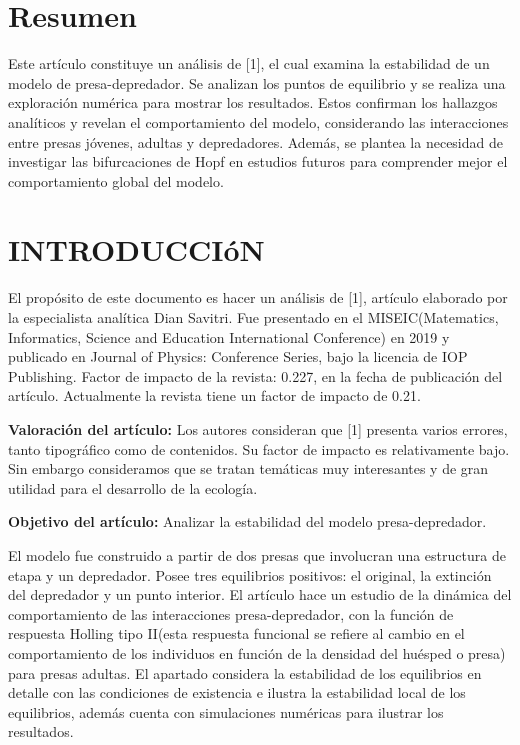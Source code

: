 \documentclass{wscpaperproc}
\theoremstyle{wsc}
\begin{document}
\maketitle

\section*{Resumen}
Este artículo constituye un análisis de [1], el cual examina la estabilidad de un modelo de presa-depredador.
Se analizan los puntos de equilibrio y se realiza una exploración numérica
para mostrar los resultados. Estos confirman los hallazgos analíticos
y revelan el comportamiento del modelo, considerando las interacciones entre presas
jóvenes, adultas y depredadores. Además, se plantea la necesidad de investigar las bifurcaciones
de Hopf en estudios futuros para comprender mejor el comportamiento global del modelo.
\section{INTRODUCCIóN}
\label{sec:intro}
El propósito de este documento es hacer un análisis de [1], artículo elaborado por la especialista analítica Dian Savitri. Fue presentado en el MISEIC(Matematics,
Informatics, Science and Education International Conference) en 2019 y publicado en Journal of Physics: Conference Series, bajo la licencia de IOP Publishing.
Factor de impacto de la revista: 0.227, en la fecha de publicación del artículo. Actualmente la revista tiene un factor de impacto de 0.21.

	{\bf Valoración del artículo:} Los autores consideran que [1] presenta varios errores, tanto tipográfico como de contenidos. Su factor de impacto es
relativamente bajo. Sin embargo consideramos que se tratan temáticas muy interesantes y de gran utilidad para el desarrollo de la ecología.

{\bf Objetivo del artículo:} Analizar la estabilidad del modelo presa-depredador.


El modelo fue construido a partir de dos presas que involucran una estructura de etapa y un depredador. Posee tres equilibrios positivos: el original, la extinción del
depredador y un punto interior. El artículo hace un estudio de la dinámica
del comportamiento de las interacciones presa-depredador, con la función de respuesta Holling tipo II(esta respuesta funcional se
refiere al cambio en el comportamiento de los individuos en función de la densidad del huésped o presa) para presas adultas. El apartado considera la estabilidad de
los equilibrios en detalle con las condiciones de existencia e ilustra la estabilidad local de los equilibrios, además cuenta con simulaciones numéricas para ilustrar
los resultados.
\end{document}
